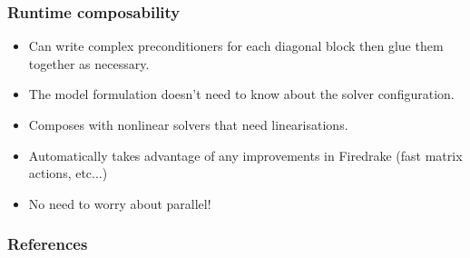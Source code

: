 \documentclass[presentation]{beamer}
\begin{document}
\begin{frame}
  \frametitle{Runtime composability}

  \begin{itemize}
  \item Can write complex preconditioners for each diagonal block then
    glue them together as necessary.

  \item The model formulation doesn't need to know about the solver
    configuration.

  \item Composes with nonlinear solvers that need linearisations.

  \item Automatically takes advantage of any improvements in Firedrake
    (fast matrix actions, etc...)

  \item No need to worry about parallel!
  \end{itemize}
\end{frame}


\appendix
\begin{frame}
  \frametitle{References}
  \printbibliography[heading=none]
\end{frame}
\end{document}
